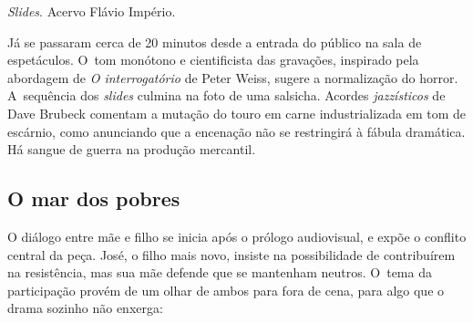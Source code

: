 {

{}%
{}%
{}%
{}%
{}%
{}%
{}%
{}%
{}%
{}%
{}%
{}%

{\it Slides}. Acervo Flávio Império.

Já se passaram cerca de 20 minutos desde a entrada do público na sala de
espetáculos. O~tom monótono e cientificista das gravações, inspirado
pela abordagem de {\it O interrogatório} de Peter Weiss, sugere a
normalização do horror. A~sequência dos {\it slides} culmina na foto de
uma salsicha. Acordes {\it jazzísticos} de Dave Brubeck comentam a
mutação do touro em carne industrializada em tom de escárnio, como
anunciando que a encenação não se restringirá à fábula dramática. Há
sangue de guerra na produção mercantil.

\subsection{O mar dos pobres}

O diálogo entre mãe e filho se inicia após o prólogo audiovisual, e
expõe o conflito central da peça. José, o filho mais novo, insiste na
possibilidade de contribuírem na resistência, mas sua mãe defende que se
mantenham neutros. O~tema da participação provém de um olhar de ambos
para fora de cena, para algo que o drama sozinho não enxerga:

}
